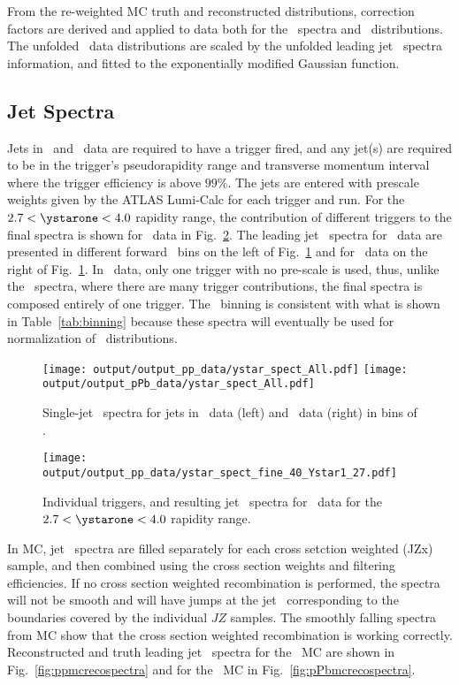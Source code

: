 From the re-weighted MC truth and reconstructed distributions, correction factors are derived and applied to data both for the \pt\ spectra and \Dphi\ distributions. The unfolded \Dphi\ data distributions are scaled by the unfolded leading jet \pt\ spectra information, and fitted to the exponentially modified Gaussian function. 


\subsection{Jet Spectra}

Jets in \pp\ and \pPb\ data are required to have a trigger fired, and any jet(s) are required to be in the trigger's pseudorapidity range and transverse momentum interval where the trigger efficiency is above $99\%$. The jets are entered with prescale weights given by the ATLAS Lumi-Calc for each trigger and run. For the $2.7<\ystarone<4.0$ rapidity range, the contribution of different triggers to the final spectra is shown for \pp\ data in Fig.~\ref{fig:ppspectrawithtrig}. The leading jet \pt\ spectra for \pp\ data are presented in different forward \ystar\ bins on the left of Fig.~\ref{fig:spectra} and for \pPb\ data on the right of Fig.~\ref{fig:spectra}. In \pPb\ data, only one trigger with no pre-scale is used, thus, unlike the \pp\ spectra, where there are many trigger contributions, the final spectra is composed entirely of one trigger. The \pT\ binning is consistent with what is shown in Table~\ref{tab:binning} because these spectra will eventually be used for normalization of \Dphi\ distributions.

\begin{figure}
	\centering
	\texttt{[image: output/output\_pp\_data/ystar\_spect\_All.pdf]} 
	\texttt{[image: output/output\_pPb\_data/ystar\_spect\_All.pdf]} 
	
	\caption{ Single-jet \pt\ spectra for jets in \pp\ data (left) and \pPb\ data (right) in bins of \ystar. }	
	\label{fig:spectra}
\end{figure}

\begin{figure}
	\centering
	\texttt{[image: output/output\_pp\_data/ystar\_spect\_fine\_40\_Ystar1\_27.pdf]} 
	\caption{ Individual triggers, and resulting jet \pT\ spectra for \pp\ data for the $2.7<\ystarone<4.0$ rapidity range. }	
	\label{fig:ppspectrawithtrig}
\end{figure}

In MC, jet \pt\ spectra are filled separately for each cross setction weighted (JZx) sample, and then combined using the cross section weights and filtering efficiencies. If no cross section weighted recombination is performed, the spectra will not be smooth and will have jumps at the jet \pt\ corresponding to the boundaries covered by the individual $JZ$ samples. The smoothly falling spectra  from MC show that the cross section weighted recombination is working correctly.  Reconstructed and truth leading jet \pt\ spectra for the \pp\ MC are shown in Fig.~\ref{fig:ppmcrecospectra} and for the \pPb\ MC in Fig.~\ref{fig:pPbmcrecospectra}. 

